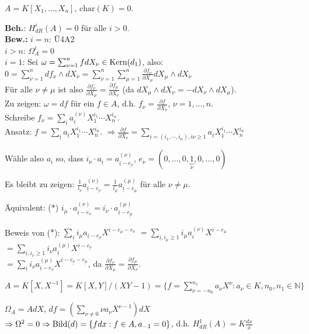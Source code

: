 \begin{nnBsp}
$A=K[X_1, \ldots, X_n]$, $\textrm{char}(K)=0$.

\textbf{Beh.}: $H_{dR}^i(A) = 0$ für alle $i>0$.\\
\textbf{Bew.: } $i=n$: Ü4A2\\
$i>n$: $\Omega_A^i=0$\\
$i=1$: Sei $\omega=\sum_{\nu=1}^nf dX_\nu\in \operatorname{Kern}(d_1)$, also:
$0=\sum_{\nu=1}^n df_\nu \wedge dX_\nu=\sum_{\nu=1}^n\sum_{\mu=1}^n\frac{\partial f_\nu}{\partial X_\mu}dX_\mu\wedge dX_\nu$\\
Für alle $\nu\neq \mu$ ist also $\frac{\partial f_\nu}{\partial X_\mu}=\frac{\partial f_\mu}{\partial X_\nu}$ 
(da $dX_\mu\wedge dX_\nu = -dX_\nu\wedge dX_\mu$).\\
Zu zeigen: $\omega = df$ für ein $f\in A$, d.h. $f_\nu=\frac{\partial f}{\partial X_\nu}$, $\nu=1, \ldots, n$.\\
Schreibe $f_\nu=\sum_{\underline{i}} a_{\underline{i}}^{(\nu)}X_1^{i_1}\cdots X_n^{i_n}$.\\
Ansatz: $f=\sum_{\underline{i}} a_{\underline{i}} X_1^{i_1}\cdots X_n^{i_n}$.
$\Rightarrow \frac{\partial f}{\partial X_\nu}
=\sum_{\underline{i}=(i_1, \cdots, i_n), i\nu\geq 1}a_{\underline{i}} X_1^{i_1}\cdots X_n^{i_n}$

Wähle also $a_{\underline{i}}$ so, dass $i_\nu\cdot a_{\underline{i}} = a_{\underline{i}-\underline{e_\nu}}^{(\nu)}$, 
$e_\nu=(0,\ldots,0,\underbrace{1}_{\nu},0,\ldots, 0)$

Es bleibt zu zeigen: $\frac{1}{i_\nu} a_{\underline{i}-\underline{e_\nu}}^{(\nu)}
=\frac{1}{i_\mu} a_{\underline{i}-e_\mu}^{(\mu)}$ für alle $\nu\neq \mu$.

Äquivalent: ($\ast$) $i_\mu\cdot a_{\underline{i}-e_{\nu}}^{(\nu)}=i_\nu \cdot a_{\underline{i}-\underline{e_\mu}}^{(\mu)}$

Beweis von ($\ast$): $\sum_{\underline{i}} i_\mu a_{\underline{i}-\underline{e_\nu}}X^{i-e_\mu-e_\nu}$
$= \sum_{\underline{i}, i_\mu\geq 1} i_\mu a_{i}^{(\nu)} X^{i-e_\mu}$
$= \sum_{\underline{i}, i_\nu\geq 1}i_\nu a_{\underline{i}}^{(\mu)}X^{\underline{i}-\underline{e_\nu}}$\\
$= \sum_{\underline{i}} i_\nu a_{\underline{i}-e_\nu}^{(\mu)}X^{\underline{i}-\underline{e_\nu}-\underline{e_\mu}}$,
da $\frac{\partial f_\nu}{\partial X_\mu} = \frac{\partial f_\mu}{\partial X_\nu}$.
\end{nnBsp}

\begin{nnBsp}
$A=K[X, X^{-1}]=K[X,Y]/(XY-1)=\{f=\sum_{\nu=-n_0}^{n_1} a_\nu X^\nu: a_\nu\in K, n_0, n_1\in \mathbb{N}\}$

$\Omega_A=AdX$, $df=(\sum_{\nu\neq 0}\nu a_\nu X^{\nu-1})dX$
$\Rightarrow \Omega^2 = 0 \Rightarrow \operatorname{Bild}(d)=\{fdx:f\in A, a_{-1}=0\}$,
d.h. $H_{dR}^{1}(A) = K\frac{dx}{x}$
\end{nnBsp}
